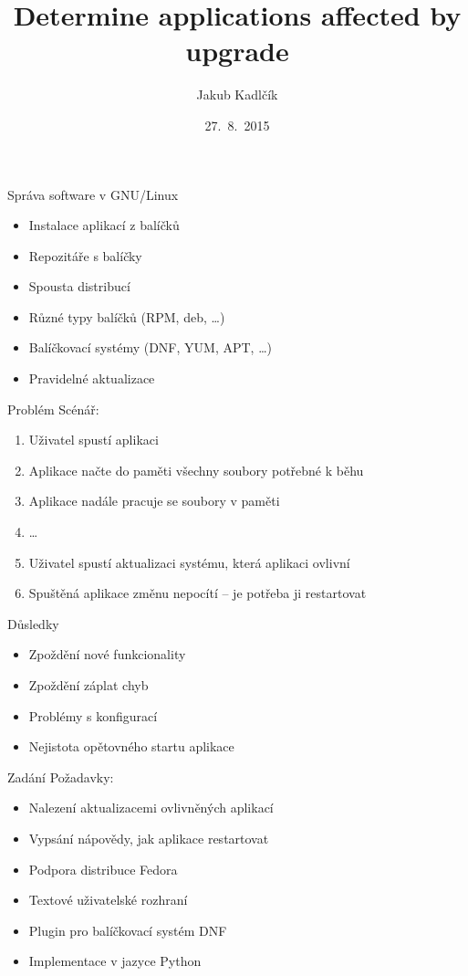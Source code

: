\documentclass{beamer}
\title[tracer]{Determine applications affected by upgrade}
\author{Jakub Kadlčík}
\institute[UP]{Univerzita Palackého v Olomouci}
\date{27.~8.~2015}
\begin{document}
	\begin{frame}
		\titlepage
	\end{frame}

	\begin{frame}{Správa software v GNU/Linux}
		\begin{itemize}
			\item Instalace aplikací z balíčků
			\item Repozitáře s balíčky
			\item Spousta distribucí
			\item Různé typy balíčků (RPM, deb, \dots)
			\item Balíčkovací systémy (DNF, YUM, APT, \dots)
			\item Pravidelné aktualizace
		\end{itemize}
	\end{frame}

	\begin{frame}{Problém}
		Scénář:
		\begin{enumerate}
			\item Uživatel spustí aplikaci
			\item Aplikace načte do paměti všechny soubory potřebné k běhu
			\item Aplikace nadále pracuje se soubory v paměti
			\item \dots
			\item Uživatel spustí aktualizaci systému, která aplikaci ovlivní
			\item Spuštěná aplikace změnu nepocítí -- je potřeba ji restartovat
		\end{enumerate}
	\end{frame}

	\begin{frame}{Důsledky}
		\begin{itemize}
			\item Zpoždění nové funkcionality
			\item Zpoždění záplat chyb
			\item Problémy s konfigurací
			\item Nejistota opětovného startu aplikace
		\end{itemize}
	\end{frame}

	\begin{frame}{Zadání}
		Požadavky:
		\begin{itemize}
			\item Nalezení aktualizacemi ovlivněných aplikací
			\item Vypsání nápovědy, jak aplikace restartovat
		\end{itemize}

		\begin{itemize}
			\item Podpora distribuce Fedora
			\item Textové uživatelské rozhraní
			\item Plugin pro balíčkovací systém DNF
			\item Implementace v jazyce Python
		\end{itemize}
	\end{frame}
\end{document}
